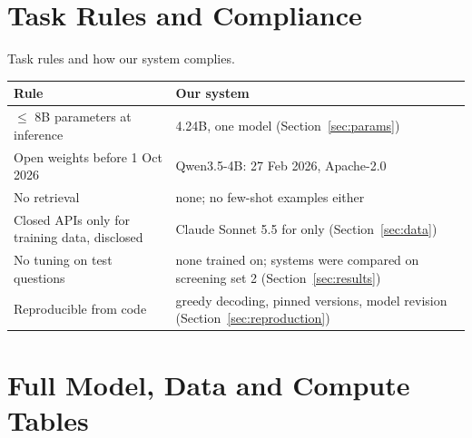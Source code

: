 \section{Task Rules and Compliance}\label{app:rules}

\begin{center}\captionsetup{type=table}
\small
\caption{Task rules and how our system complies.}\label{tab:rules}
\begin{tabularx}{\columnwidth}{@{}L{0.36\columnwidth}Y@{}}
\toprule
Rule & Our system \\
\midrule
$\leq$ 8B parameters at inference & 4.24B, one model (Section~\ref{sec:params}) \\
Open weights before 1 Oct 2026 & Qwen3.5-4B: 27 Feb 2026, Apache-2.0 \\
No retrieval & none; no few-shot examples either \\
Closed APIs only for training data, disclosed & Claude Sonnet 5.5 for \sinmulu{} only (Section~\ref{sec:data}) \\
No tuning on test questions & none trained on; systems were compared on screening set 2 (Section~\ref{sec:results}) \\
Reproducible from code & greedy decoding, pinned versions, model revision (Section~\ref{sec:reproduction}) \\
\bottomrule
\end{tabularx}
\end{center}

\section{Full Model, Data and Compute Tables}\label{app:tables}

